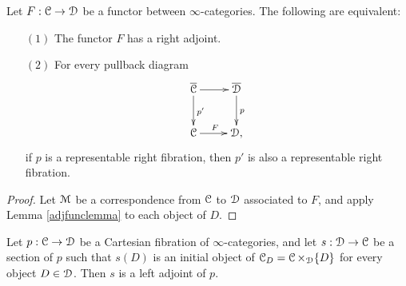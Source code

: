 \begin{proposition}\label{adjfuncbaby}
Let $F: \operatorname{\mathcal{C}} \rightarrow \operatorname{\mathcal{D}}$ be a functor between $\infty$-categories.
The following are equivalent:
\begin{itemize}
\item[$(1)$] The functor $F$ has a right adjoint.
\item[$(2)$] For every pullback diagram
$$ \xymatrix{ \overline{\calC} \ar[r] \ar[d]^{p'} & \overline{\calD} \ar[d]^{p} \\
\calC \ar[r]^{F} & \calD, }$$
if $p$ is a representable right fibration, then $p'$ is also a representable right fibration.
\end{itemize}
\end{proposition}

\begin{proof}
Let $\operatorname{\mathcal{M}}$ be a correspondence from $\operatorname{\mathcal{C}}$ to $\operatorname{\mathcal{D}}$ associated to $F$, and apply
Lemma \ref{adjfunclemma} to each object of $D$.
\end{proof}

\begin{proposition}\label{quuquu}
Let $p: \operatorname{\mathcal{C}} \rightarrow \operatorname{\mathcal{D}}$ be a Cartesian fibration of $\infty$-categories, and let
$s: \operatorname{\mathcal{D}} \rightarrow \operatorname{\mathcal{C}}$ be a section of $p$ such that $s(D)$ is an initial object
of $\operatorname{\mathcal{C}}_{D} = \operatorname{\mathcal{C}} \times_{\operatorname{\mathcal{D}}} \{D\}$ for every object $D \in \operatorname{\mathcal{D}}$. Then
$s$ is a left adjoint of $p$.
\end{proposition}

